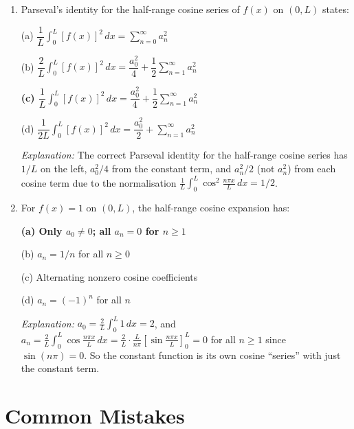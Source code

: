 \documentclass[12pt,a4paper]{article}
\begin{document}
\begin{enumerate}[leftmargin=*, label=\textbf{Q\arabic*.}]
\item Parseval's identity for the half-range cosine series of $f(x)$ on $(0,L)$ states:

(a) $\dfrac{1}{L}\displaystyle\int_0^L [f(x)]^2\,dx = \sum_{n=0}^{\infty} a_n^2$

(b) $\dfrac{2}{L}\displaystyle\int_0^L [f(x)]^2\,dx = \dfrac{a_0^2}{4} + \dfrac{1}{2}\displaystyle\sum_{n=1}^{\infty} a_n^2$

\textbf{(c) $\dfrac{1}{L}\displaystyle\int_0^L [f(x)]^2\,dx = \dfrac{a_0^2}{4} + \dfrac{1}{2}\displaystyle\sum_{n=1}^{\infty} a_n^2$}

(d) $\dfrac{1}{2L}\displaystyle\int_0^L [f(x)]^2\,dx = \dfrac{a_0^2}{2} + \sum_{n=1}^{\infty} a_n^2$

\textit{Explanation:} The correct Parseval identity for the half-range cosine series has $1/L$ on the left, $a_0^2/4$ from the constant term, and $a_n^2/2$ (not $a_n^2$) from each cosine term due to the normalisation $\frac{1}{L}\int_0^L\cos^2\frac{n\pi x}{L}\,dx = 1/2$.

\item For $f(x)=1$ on $(0,L)$, the half-range cosine expansion has:

\textbf{(a) Only $a_0 \neq 0$; all $a_n = 0$ for $n \geq 1$}

(b) $a_n = 1/n$ for all $n \geq 0$

(c) Alternating nonzero cosine coefficients

(d) $a_n = (-1)^n$ for all $n$

\textit{Explanation:} $a_0 = \frac{2}{L}\int_0^L 1\,dx = 2$, and $a_n = \frac{2}{L}\int_0^L\cos\frac{n\pi x}{L}\,dx = \frac{2}{L}\cdot\frac{L}{n\pi}\left[\sin\frac{n\pi x}{L}\right]_0^L = 0$ for all $n\geq 1$ since $\sin(n\pi)=0$. So the constant function is its own cosine ``series'' with just the constant term.

\end{enumerate}

\section{Common Mistakes}
\end{document}
